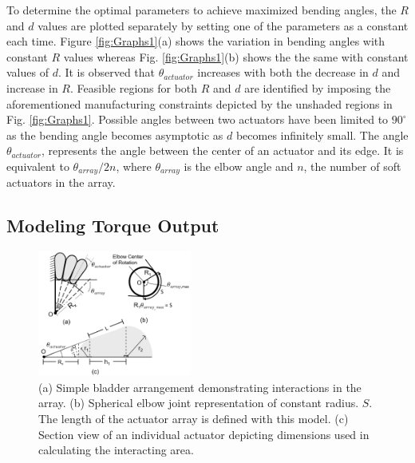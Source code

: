 \documentclass[letterpaper, 10 pt, conference]{ieeeconf}  %
\begin{document}
To determine the optimal parameters to achieve maximized bending angles, the $R$ and $d$ values are plotted separately by setting one of the parameters as a constant each time. Figure \ref{fig:Graphs1}(a) shows the variation in bending angles with constant $R$ values whereas Fig. \ref{fig:Graphs1}(b) shows the the same with constant values of $d$. It is observed that $\theta_{actuator}$ increases with both the decrease in $d$ and increase in $R$. Feasible regions for both $R$ and $d$ are identified by imposing the aforementioned manufacturing constraints depicted by the unshaded regions in Fig. \ref{fig:Graphs1}. Possible angles between two actuators have been limited to $90^{\circ}$ as the bending angle becomes asymptotic as $d$ becomes infinitely small. The angle $\theta_{actuator}$, represents the angle between the center of an actuator and its edge. It is equivalent to $\theta_{array}/2n$, where $\theta_{array}$ is the elbow angle and $n$, the number of soft actuators in the array. 


\subsection{Modeling Torque Output}



\begin{figure}[t!]
\centering
\includegraphics[width=0.45\textwidth]{model3.PNG}
\caption{(a) Simple bladder arrangement demonstrating interactions in the array.  (b) Spherical elbow joint representation of constant radius. $S$. The length of the actuator array is defined with this model. (c) Section view of an individual actuator depicting dimensions used in calculating the interacting area. }
\label{fig:hotness}
\end{figure}
\end{document}
